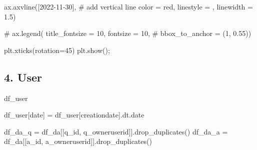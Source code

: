 \documentclass[
  letterpaper,
  DIV=11,
  numbers=noendperiod]{scrartcl}
\newenvironment{Shaded}{\begin{snugshade}}{\end{snugshade}}
\newcommand{\CommentTok}[1]{\textcolor[rgb]{0.37,0.37,0.37}{#1}}
\newcommand{\DecValTok}[1]{\textcolor[rgb]{0.68,0.00,0.00}{#1}}
\newcommand{\FloatTok}[1]{\textcolor[rgb]{0.68,0.00,0.00}{#1}}
\newcommand{\NormalTok}[1]{\textcolor[rgb]{0.00,0.23,0.31}{#1}}
\newcommand{\OperatorTok}[1]{\textcolor[rgb]{0.37,0.37,0.37}{#1}}
\newcommand{\StringTok}[1]{\textcolor[rgb]{0.13,0.47,0.30}{#1}}
\begin{document}
\begin{Shaded}
\begin{Highlighting}[]
\NormalTok{ax.axvline([}\StringTok{\textquotesingle{}2022{-}11{-}30\textquotesingle{}}\NormalTok{], }\CommentTok{\# add vertical line}
\NormalTok{           color }\OperatorTok{=} \StringTok{\textquotesingle{}red\textquotesingle{}}\NormalTok{,}
\NormalTok{           linestyle }\OperatorTok{=} \StringTok{\textquotesingle{}{-}{-}\textquotesingle{}}\NormalTok{,}
\NormalTok{           linewidth }\OperatorTok{=} \FloatTok{1.5}\NormalTok{)}

\CommentTok{\# ax.legend( title\_fontsize = 10, fontsize = 10,}
\CommentTok{\#           bbox\_to\_anchor = (1, 0.55))}

\NormalTok{plt.xticks(rotation}\OperatorTok{=}\DecValTok{45}\NormalTok{)}
\NormalTok{plt.show()}\OperatorTok{;}
\end{Highlighting}
\end{Shaded}

\subsection{4. User}\label{user-1}

\begin{Shaded}
\begin{Highlighting}[]
\NormalTok{df\_user}
\end{Highlighting}
\end{Shaded}

\begin{Shaded}
\begin{Highlighting}[]
\NormalTok{df\_user[}\StringTok{\textquotesingle{}date\textquotesingle{}}\NormalTok{]   }\OperatorTok{=}\NormalTok{ df\_user[}\StringTok{\textquotesingle{}creationdate\textquotesingle{}}\NormalTok{].dt.date}
\end{Highlighting}
\end{Shaded}

\begin{Shaded}
\begin{Highlighting}[]
\NormalTok{df\_da\_q }\OperatorTok{=}\NormalTok{ df\_da[[}\StringTok{\textquotesingle{}q\_id\textquotesingle{}}\NormalTok{, }\StringTok{\textquotesingle{}q\_owneruserid\textquotesingle{}}\NormalTok{]].drop\_duplicates()}
\NormalTok{df\_da\_a }\OperatorTok{=}\NormalTok{ df\_da[[}\StringTok{\textquotesingle{}a\_id\textquotesingle{}}\NormalTok{, }\StringTok{\textquotesingle{}a\_owneruserid\textquotesingle{}}\NormalTok{]].drop\_duplicates()}
\end{Highlighting}
\end{Shaded}
\end{document}
